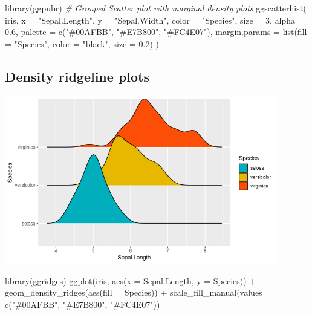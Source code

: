 \documentclass[
]{book}
\newenvironment{Shaded}{\begin{snugshade}}{\end{snugshade}}
\newcommand{\AttributeTok}[1]{\textcolor[rgb]{0.77,0.63,0.00}{#1}}
\newcommand{\CommentTok}[1]{\textcolor[rgb]{0.56,0.35,0.01}{\textit{#1}}}
\newcommand{\DecValTok}[1]{\textcolor[rgb]{0.00,0.00,0.81}{#1}}
\newcommand{\FloatTok}[1]{\textcolor[rgb]{0.00,0.00,0.81}{#1}}
\newcommand{\FunctionTok}[1]{\textcolor[rgb]{0.00,0.00,0.00}{#1}}
\newcommand{\NormalTok}[1]{#1}
\newcommand{\SpecialCharTok}[1]{\textcolor[rgb]{0.00,0.00,0.00}{#1}}
\newcommand{\StringTok}[1]{\textcolor[rgb]{0.31,0.60,0.02}{#1}}
\begin{document}
\begin{Shaded}
\begin{Highlighting}[]
\FunctionTok{library}\NormalTok{(ggpubr)}
\CommentTok{\# Grouped Scatter plot with marginal density plots}
\FunctionTok{ggscatterhist}\NormalTok{(}
\NormalTok{  iris, }
  \AttributeTok{x =} \StringTok{"Sepal.Length"}\NormalTok{, }
  \AttributeTok{y =} \StringTok{"Sepal.Width"}\NormalTok{,}
  \AttributeTok{color =} \StringTok{"Species"}\NormalTok{, }
  \AttributeTok{size =} \DecValTok{3}\NormalTok{, }
  \AttributeTok{alpha =} \FloatTok{0.6}\NormalTok{,}
  \AttributeTok{palette =} \FunctionTok{c}\NormalTok{(}\StringTok{"\#00AFBB"}\NormalTok{, }\StringTok{"\#E7B800"}\NormalTok{, }\StringTok{"\#FC4E07"}\NormalTok{),}
  \AttributeTok{margin.params =} \FunctionTok{list}\NormalTok{(}\AttributeTok{fill =} \StringTok{"Species"}\NormalTok{, }\AttributeTok{color =} \StringTok{"black"}\NormalTok{, }\AttributeTok{size =} \FloatTok{0.2}\NormalTok{)}
\NormalTok{  )}
\end{Highlighting}
\end{Shaded}

\hypertarget{density-ridgeline-plots}{%
\subsection{Density ridgeline plots}\label{density-ridgeline-plots}}

\includegraphics[width=4.6875in,height=\textheight]{images/10/000004.png}

\begin{Shaded}
\begin{Highlighting}[]
\FunctionTok{library}\NormalTok{(ggridges)}
\FunctionTok{ggplot}\NormalTok{(iris, }\FunctionTok{aes}\NormalTok{(}\AttributeTok{x =}\NormalTok{ Sepal.Length, }\AttributeTok{y =}\NormalTok{ Species)) }\SpecialCharTok{+}
  \FunctionTok{geom\_density\_ridges}\NormalTok{(}\FunctionTok{aes}\NormalTok{(}\AttributeTok{fill =}\NormalTok{ Species)) }\SpecialCharTok{+}
  \FunctionTok{scale\_fill\_manual}\NormalTok{(}\AttributeTok{values =} \FunctionTok{c}\NormalTok{(}\StringTok{"\#00AFBB"}\NormalTok{, }\StringTok{"\#E7B800"}\NormalTok{, }\StringTok{"\#FC4E07"}\NormalTok{))}
\end{Highlighting}
\end{Shaded}
\end{document}
